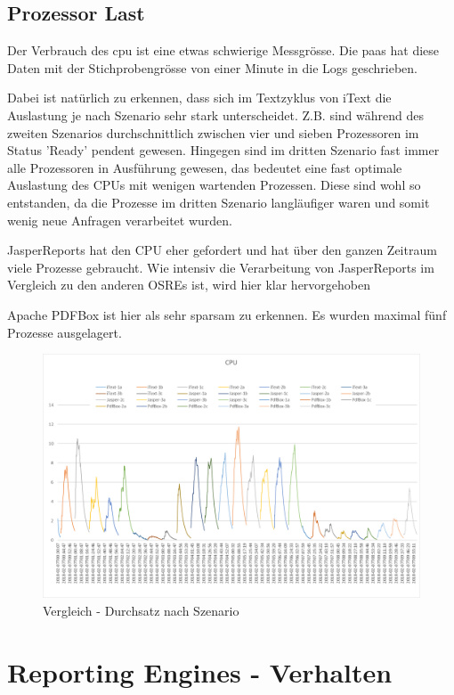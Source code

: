\documentclass[main.tex]{subfiles}
\begin{document}
\subsection{Prozessor Last}
Der Verbrauch des \acrshort{cpu} ist eine etwas schwierige Messgrösse. Die \acrlong{paas} hat diese Daten mit der Stichprobengrösse von einer Minute in die Logs geschrieben.

Dabei ist natürlich zu erkennen, dass sich im Textzyklus von iText  die Auslastung je nach Szenario sehr stark unterscheidet. Z.B. sind während des zweiten Szenarios durchschnittlich zwischen vier und sieben Prozessoren im Status 'Ready' pendent gewesen. Hingegen sind im dritten Szenario fast immer alle Prozessoren in Ausführung gewesen, das bedeutet eine fast optimale Auslastung des CPUs mit wenigen wartenden Prozessen. Diese sind wohl so entstanden, da die Prozesse im dritten Szenario langläufiger waren und somit wenig neue Anfragen verarbeitet wurden.

JasperReports hat den CPU eher gefordert und hat über den ganzen Zeitraum viele Prozesse gebraucht. Wie intensiv die Verarbeitung von JasperReports im Vergleich zu den anderen OSREs ist, wird hier klar hervorgehoben

Apache PDFBox ist hier als sehr sparsam zu erkennen. Es wurden maximal fünf Prozesse ausgelagert. 
\begin{figure}[!hb]
\includegraphics[width=\textwidth]{mainpart/4_analyse_img/CPUVergleich.png}
 \caption{Vergleich - Durchsatz nach Szenario}
 \label{figure:cpuVergleich}
\end{figure}




\section{Reporting Engines - Verhalten}
\end{document}
